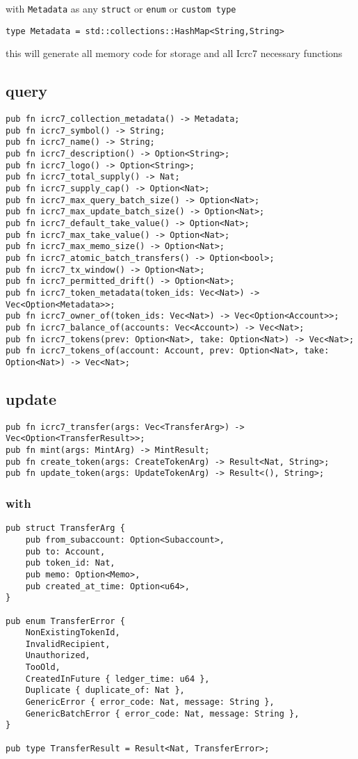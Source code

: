 \documentclass[11pt]{article}
\begin{document}
with \texttt{Metadata} as any \texttt{struct} or \texttt{enum} or \texttt{custom type}
\begin{verbatim}
type Metadata = std::collections::HashMap<String,String>
\end{verbatim}

this will generate all memory code for storage and all Icrc7 necessary
functions
\subsection{query}
\label{sec:org08789d3}
\begin{verbatim}
pub fn icrc7_collection_metadata() -> Metadata;
pub fn icrc7_symbol() -> String;
pub fn icrc7_name() -> String;
pub fn icrc7_description() -> Option<String>;
pub fn icrc7_logo() -> Option<String>;
pub fn icrc7_total_supply() -> Nat;
pub fn icrc7_supply_cap() -> Option<Nat>;
pub fn icrc7_max_query_batch_size() -> Option<Nat>;
pub fn icrc7_max_update_batch_size() -> Option<Nat>;
pub fn icrc7_default_take_value() -> Option<Nat>;
pub fn icrc7_max_take_value() -> Option<Nat>;
pub fn icrc7_max_memo_size() -> Option<Nat>;
pub fn icrc7_atomic_batch_transfers() -> Option<bool>;
pub fn icrc7_tx_window() -> Option<Nat>;
pub fn icrc7_permitted_drift() -> Option<Nat>;
pub fn icrc7_token_metadata(token_ids: Vec<Nat>) -> Vec<Option<Metadata>>;
pub fn icrc7_owner_of(token_ids: Vec<Nat>) -> Vec<Option<Account>>;
pub fn icrc7_balance_of(accounts: Vec<Account>) -> Vec<Nat>;
pub fn icrc7_tokens(prev: Option<Nat>, take: Option<Nat>) -> Vec<Nat>;
pub fn icrc7_tokens_of(account: Account, prev: Option<Nat>, take: Option<Nat>) -> Vec<Nat>;
\end{verbatim}
\subsection{update}
\label{sec:orgf492761}
\begin{verbatim}
pub fn icrc7_transfer(args: Vec<TransferArg>) -> Vec<Option<TransferResult>>;
pub fn mint(args: MintArg) -> MintResult;
pub fn create_token(args: CreateTokenArg) -> Result<Nat, String>;
pub fn update_token(args: UpdateTokenArg) -> Result<(), String>;
\end{verbatim}

\subsubsection{with}
\label{sec:org3d1d01b}
\begin{verbatim}
pub struct TransferArg {
    pub from_subaccount: Option<Subaccount>,
    pub to: Account,
    pub token_id: Nat,
    pub memo: Option<Memo>,
    pub created_at_time: Option<u64>,
}

pub enum TransferError {
    NonExistingTokenId,
    InvalidRecipient,
    Unauthorized,
    TooOld,
    CreatedInFuture { ledger_time: u64 },
    Duplicate { duplicate_of: Nat },
    GenericError { error_code: Nat, message: String },
    GenericBatchError { error_code: Nat, message: String },
}

pub type TransferResult = Result<Nat, TransferError>;
\end{verbatim}
\end{document}
